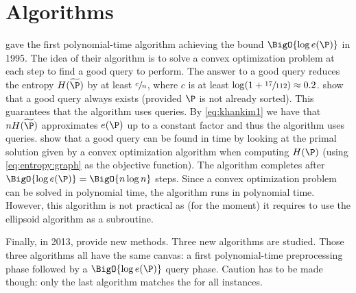 \section{Algorithms}

\citet*{kahn:1995} gave the first polynomial-time algorithm achieving the bound
$\BigO{\log e(\P)}$ in 1995. The idea of their algorithm is to solve a convex
optimization problem at each step to find a good query to perform. The answer
to a good query reduces the entropy \(H(\widetilde{\P})\) by at least
\(\sfrac{c}{n}\), where \(c\) is at least \(\log(1+\sfrac{17}{112}) \approx
0.2\). \citet*{kahn:1995} show that a good query always exists (provided
\(\P\) is not already sorted). This guarantees that the algorithm uses
 queries. By \ref{eq:khankim1} we have that \(n
H(\widetilde{\P})\) approximates \(e(\P)\) up to a constant factor and thus the
algorithm uses  queries. \citet*{kahn:1995} show that a good
query can be found in  time by looking at the primal solution given
by a convex optimization algorithm when computing \(H(\P)\) (using
\ref{eq:entropy:graph} as the objective function). The algorithm completes
after \(\BigO{\log e(\P)} = \BigO{n \log n}\) steps. Since a convex
optimization problem can be solved in polynomial time, the algorithm runs in
polynomial time.
However, this algorithm
is not practical as (for the moment) it requires to use the ellipsoid
algorithm as a subroutine.

Finally, in 2013, \citet*{cardinal:2013} provide new methods. Three new
algorithms are studied. Those three algorithms all have the same canvas: a
first polynomial-time preprocessing phase followed by a $\BigO{\log e(\P)}$
query phase. Caution has to be made though: only the last
algorithm matches the \ITLB for all \SUPI instances.

